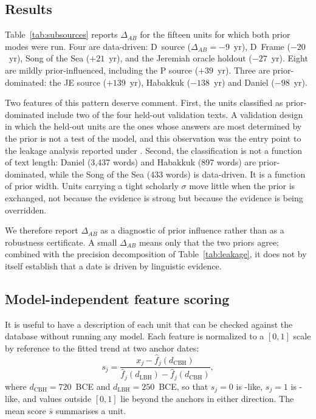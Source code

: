 \subsection*{Results}

Table~\ref{tab:subsources} reports $\Delta_{AB}$ for the fifteen units for
which both prior modes were run.  Four are data-driven: D~source
($\Delta_{AB} = -9$~yr), D~Frame ($-20$~yr), Song of the Sea ($+21$~yr),
and the Jeremiah oracle holdout ($-27$~yr).  Eight are mildly
prior-influenced, including the P source ($+39$~yr).  Three are
prior-dominated: the JE source ($+139$~yr), Habakkuk ($-138$~yr) and
Daniel ($-98$~yr).

Two features of this pattern deserve comment.  First, the units classified
as prior-dominated include two of the four held-out validation texts.  A
validation design in which the held-out units are the ones whose answers
are most determined by the prior is not a test of the model, and this
observation was the entry point to the leakage analysis reported under
.  Second, the classification is not a function of
text length: Daniel (3{,}437 words) and Habakkuk (897 words) are
prior-dominated, while the Song of the Sea (433 words) is data-driven.  It
is a function of prior width.  Units carrying a tight scholarly $\sigma$
move little when the prior is exchanged, not because the evidence is
strong but because the evidence is being overridden.

We therefore report $\Delta_{AB}$ as a diagnostic of prior influence rather
than as a robustness certificate.  A small $\Delta_{AB}$ means only that
the two priors agree; combined with the precision decomposition of
Table~\ref{tab:leakage}, it does not by itself establish that a date is
driven by linguistic evidence.

\subsection*{Model-independent feature scoring}

It is useful to have a description of each unit that can be checked against
the \bhsa{} database without running any model.  Each feature is normalized
to a $[0,1]$ scale by reference to the fitted trend at two anchor dates:
%
\begin{equation}
  s_j = \frac{x_j - \hat{f}_j(d_{\text{CBH}})}{
    \hat{f}_j(d_{\text{LBH}}) - \hat{f}_j(d_{\text{CBH}})},
  \label{eq:lbh_score}
\end{equation}
%
where $d_{\text{CBH}} = 720$~BCE and $d_{\text{LBH}} = 250$~BCE, so that
$s_j = 0$ is \cbh{}-like, $s_j = 1$ is \lbh{}-like, and values outside
$[0,1]$ lie beyond the anchors in either direction.  The mean score
$\bar{s}$ summarises a unit.

